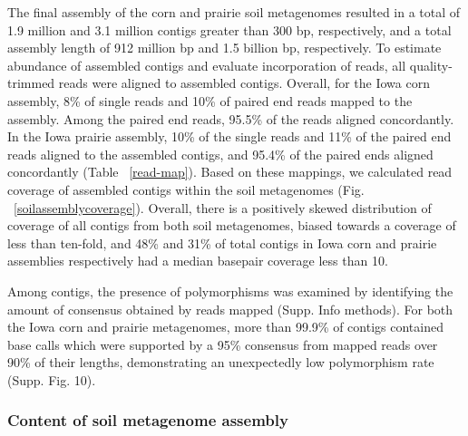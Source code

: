 \documentclass[11pt]{article} %
\begin{document}
The final assembly of the corn and prairie soil metagenomes resulted
in a total of 1.9 million and 3.1 million contigs greater than 300 bp,
respectively, and a total assembly length of 912 million bp and 1.5
billion bp, respectively.  To estimate abundance of assembled contigs
and evaluate incorporation of reads, all quality-trimmed reads were
aligned to assembled contigs.  Overall, for the Iowa corn assembly,
8\% of single reads and 10\% of paired end reads mapped to the
assembly.  Among the paired end reads, 95.5\% of the reads aligned
concordantly.  In the Iowa prairie assembly, 10\% of the single reads
and 11\% of the paired end reads aligned to the assembled contigs, and
95.4\% of the paired ends aligned concordantly (Table
~\ref{read-map}).  Based on these mappings, we calculated read
coverage of assembled contigs within the soil metagenomes
(Fig. ~\ref{soilassemblycoverage}).  Overall, there is a positively
skewed distribution of coverage of all contigs from both soil
metagenomes, biased towards a coverage of less than ten-fold, and 48\%
and 31\% of total contigs in Iowa corn and prairie assemblies
respectively had a median basepair coverage less than 10.

Among contigs, the presence of polymorphisms was examined by
identifying the amount of consensus obtained by reads mapped
(Supp. Info methods).  For both the Iowa corn and prairie metagenomes,
more than 99.9\% of contigs contained base calls which were supported
by a 95\% consensus from mapped reads over 90\% of their lengths,
demonstrating an unexpectedly low polymorphism rate
(Supp. Fig. 10).



\subsubsection{Content of soil metagenome assembly}

\end{document}
